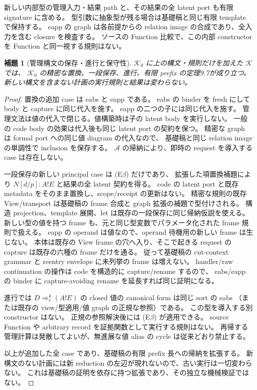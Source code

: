 \documentclass[11pt,a4paper]{article}
\newtheorem{lemma}[definition]{補題}
\newcommand{\Core}{\mathcal K}
\begin{document}
新しい内部型の管理入力・結果 path と、その結果の全 latent port も有限 signature に含める。
型引数に抽象型が残る場合は基礎稿と同じ有限 template で保持する。
eapp の graph は各前提からの relation image の合成であり、全入力を含む closure を検査する。
ソースの Function 比較で、この内部 constructor を Function と同一視する規則はない。

\begin{lemma}[管理構文の保存・進行と保守性]
\(\Core_0\) に上の構文・規則だけを加えた \(\Core\) では、
\(\Core_0\) の精密な置換、一段保存、進行、有限 prefix の定理9.7が成り立つ。
新しい構文を含まない計画の実行規則と結果は変わらない。
\end{lemma}
\begin{proof}
置換の追加 case は eabs と eapp である。
eabs の binder を fresh にして body と capture に同じ代入を施す。
eapp の二つの子には同じ代入を施す。
管理文法は値の代入で閉じる。値構築時は子の latent body を実行しない。
一般の code body の効果は代入後も同じ latent port の契約を保つ。
精密な graph は formal port への同じ値 diagram の代入なので、
基礎稿と同じ relation image の単調性で inclusion を保存する。
\(\mathcal A\) の帰納により、即時の request を導入する case は存在しない。

一段保存の新しい principal case は (E\(\beta\)) だけであり、
拡張した項置換補題により \(N[d/p]:A!E\) と結果の全 latent 契約を得る。
code の latent port と既存 metadata をそのまま置換し、scope/receipt の更新はない。
精密な規則の既存 View/transport は基礎稿の frame 合成と graph 拡張の補題で型付けされる。
構造 projection、template 展開、let は既存の一段保存に同じ帰納仮説を使える。
新しい型の値を持つ frame も、元と同じ型変数でパラメータ化された frame 規則で扱える。
eapp の operand は値なので、operand 待機用の新しい frame は生じない。
本体は既存の View frame の穴へ入り、そこで起きる request の capture は既存の六種の frame だけを通る。
従って基礎稿の cut-context grammar と reentry envelope に未列挙の frame は増えない。
handler/raw continuation の操作は code を構造的に capture/rename するので、
eabs/eapp の binder に capture-avoiding rename を延長すれば同じ証明になる。

進行では \(D\Rightarrow_e^k(A!E)\) の closed 値の canonical form は同じ sort の eabs
（または既存の view/型適用/値 graph の正規な参照）である。
この型を導入する別 constructor はない。
正規の参照解決後には (E\(\beta\)) が適用できる。
source Function や arbitrary record を証拠関数として実行する規則はない。
再帰する管理計算は発散してよいが、無進展な値 alias の cycle は従来どおり禁止する。

以上が追加した全 case であり、基礎稿の有限 prefix 長への帰納を拡張する。
新構文のない計画には新 reduction の左辺が現れないので、古い実行は一切変わらない。
これは基礎稿の証明を依存に持つ拡張であり、その独立な機械検証ではない。
\end{proof}
\end{document}
